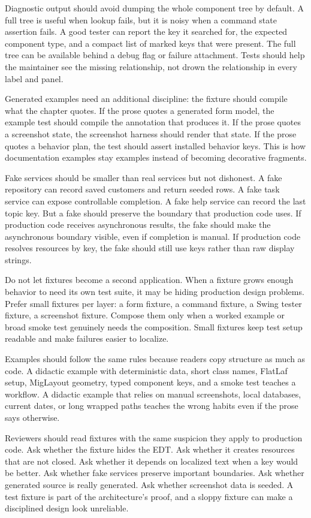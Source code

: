 Diagnostic output should avoid dumping the whole component tree by default. A full tree is useful when lookup fails, but it is noisy when a command state assertion fails. A good tester can report the key it searched for, the expected component type, and a compact list of marked keys that were present. The full tree can be available behind a debug flag or failure attachment. Tests should help the maintainer see the missing relationship, not drown the relationship in every label and panel.

Generated examples need an additional discipline: the fixture should compile what the chapter quotes. If the prose quotes a generated form model, the example test should compile the annotation that produces it. If the prose quotes a screenshot state, the screenshot harness should render that state. If the prose quotes a behavior plan, the test should assert installed behavior keys. This is how documentation examples stay examples instead of becoming decorative fragments.

Fake services should be smaller than real services but not dishonest. A fake repository can record saved customers and return seeded rows. A fake task service can expose controllable completion. A fake help service can record the last topic key. But a fake should preserve the boundary that production code uses. If production code receives asynchronous results, the fake should make the asynchronous boundary visible, even if completion is manual. If production code resolves resources by key, the fake should still use keys rather than raw display strings.

Do not let fixtures become a second application. When a fixture grows enough behavior to need its own test suite, it may be hiding production design problems. Prefer small fixtures per layer: a form fixture, a command fixture, a Swing tester fixture, a screenshot fixture. Compose them only when a worked example or broad smoke test genuinely needs the composition. Small fixtures keep test setup readable and make failures easier to localize.

Examples should follow the same rules because readers copy structure as much as code. A didactic example with deterministic data, short class names, FlatLaf setup, MigLayout geometry, typed component keys, and a smoke test teaches a workflow. A didactic example that relies on manual screenshots, local databases, current dates, or long wrapped paths teaches the wrong habits even if the prose says otherwise.

Reviewers should read fixtures with the same suspicion they apply to production code. Ask whether the fixture hides the EDT. Ask whether it creates resources that are not closed. Ask whether it depends on localized text when a key would be better. Ask whether fake services preserve important boundaries. Ask whether generated source is really generated. Ask whether screenshot data is seeded. A test fixture is part of the architecture's proof, and a sloppy fixture can make a disciplined design look unreliable.

